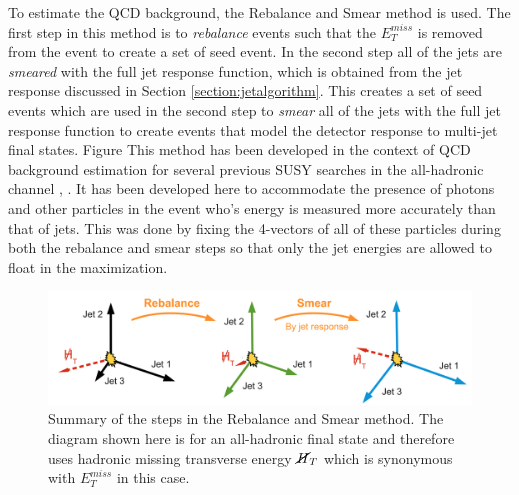 To estimate the QCD background, the Rebalance and Smear method is used.  The first step in this method is to \textit{rebalance} events such that the $E_T^{miss}$ is removed from the event to create a set of seed event.  In the second step all of the jets are \textit{smeared} with the full jet response function, which is obtained from the jet response discussed in Section \ref{section:jetalgorithm}.  This creates a set of seed events which are used in the second step to \textit{smear} all of the jets with the full jet response function to create events that model the detector response to multi-jet final states.  Figure This method has been developed in the context of QCD background estimation for several previous SUSY searches in the all-hadronic channel \cite{Goebel:2015kca}, \cite{RandS:2017abv}.  It has been developed here to accommodate the presence of photons and other particles in the event who's energy is measured more accurately than that of jets.  This was done by fixing the 4-vectors of all of these particles during both the rebalance and smear steps so that only the jet energies are allowed to float in the maximization.
\begin{figure}[h]
	\centering
	\includegraphics[width=1.0\linewidth]{Figures/RandScartoon}
	\caption[Summary of the steps for the Rebalance and Smear method.]{Summary of the steps in the Rebalance and Smear method.  The diagram shown here is for an all-hadronic final state and therefore uses hadronic missing transverse energy $\cancel{H}_T$ which is synonymous with $E_T^{miss}$ in this case\cite{Goebel:2015kca}.}
	\label{fig:randscartoon}
\end{figure}

